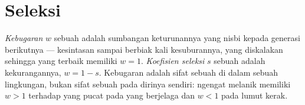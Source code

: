 \section{Seleksi}

\begin{definition}[Kebugaran]\label{def:b2:population-genetics:fitness}
\emph{Kebugaran} $w$ sebuah  adalah sumbangan keturunannya
yang nisbi kepada generasi berikutnya --- kesintasan sampai berbiak
kali kesuburannya, yang diskalakan sehingga  yang terbaik
memiliki $w = 1$. \emph{Koefisien seleksi} $s$ sebuah  adalah
kekurangannya, $w = 1 - s$. Kebugaran adalah sifat sebuah  di
dalam sebuah lingkungan, bukan sifat sebuah  pada dirinya sendiri:
 ngengat melanik memiliki $w > 1$ terhadap  yang pucat pada
 yang berjelaga dan $w < 1$ pada lumut kerak.
\end{definition}

